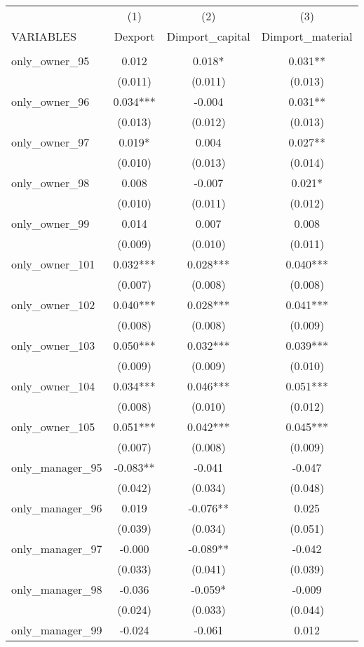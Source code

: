 \begin{tabular}{lccc} \hline
 & (1) & (2) & (3) \\
VARIABLES & Dexport & Dimport\_capital & Dimport\_material \\ \hline
 &  &  &  \\
only\_owner\_95 & 0.012 & 0.018* & 0.031** \\
 & (0.011) & (0.011) & (0.013) \\
only\_owner\_96 & 0.034*** & -0.004 & 0.031** \\
 & (0.013) & (0.012) & (0.013) \\
only\_owner\_97 & 0.019* & 0.004 & 0.027** \\
 & (0.010) & (0.013) & (0.014) \\
only\_owner\_98 & 0.008 & -0.007 & 0.021* \\
 & (0.010) & (0.011) & (0.012) \\
only\_owner\_99 & 0.014 & 0.007 & 0.008 \\
 & (0.009) & (0.010) & (0.011) \\
only\_owner\_101 & 0.032*** & 0.028*** & 0.040*** \\
 & (0.007) & (0.008) & (0.008) \\
only\_owner\_102 & 0.040*** & 0.028*** & 0.041*** \\
 & (0.008) & (0.008) & (0.009) \\
only\_owner\_103 & 0.050*** & 0.032*** & 0.039*** \\
 & (0.009) & (0.009) & (0.010) \\
only\_owner\_104 & 0.034*** & 0.046*** & 0.051*** \\
 & (0.008) & (0.010) & (0.012) \\
only\_owner\_105 & 0.051*** & 0.042*** & 0.045*** \\
 & (0.007) & (0.008) & (0.009) \\
only\_manager\_95 & -0.083** & -0.041 & -0.047 \\
 & (0.042) & (0.034) & (0.048) \\
only\_manager\_96 & 0.019 & -0.076** & 0.025 \\
 & (0.039) & (0.034) & (0.051) \\
only\_manager\_97 & -0.000 & -0.089** & -0.042 \\
 & (0.033) & (0.041) & (0.039) \\
only\_manager\_98 & -0.036 & -0.059* & -0.009 \\
 & (0.024) & (0.033) & (0.044) \\
only\_manager\_99 & -0.024 & -0.061 & 0.012 \\

\end{tabular}
